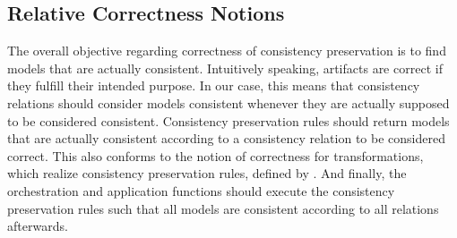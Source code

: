 

\subsection{Relative Correctness Notions}

The overall objective regarding correctness of consistency preservation is to find models that are actually consistent.
Intuitively speaking, artifacts are correct if they fulfill their intended purpose. 
In our case, this means that consistency relations should consider models consistent whenever they are actually supposed to be considered consistent. 
Consistency preservation rules should return models that are actually consistent according to a consistency relation to be considered correct.
This also conforms to the notion of correctness for transformations, which realize consistency preservation rules, defined by \textcite{stevens2010sosym}.
And finally, the orchestration and application functions should execute the consistency preservation rules such that all models are consistent according to all relations afterwards.

